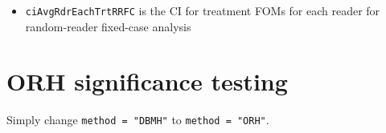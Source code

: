\documentclass[]{book}
\newenvironment{Shaded}{\begin{snugshade}}{\end{snugshade}}
\newcommand{\CommentTok}[1]{\textcolor[rgb]{0.56,0.35,0.01}{\textit{#1}}}
\newcommand{\NormalTok}[1]{#1}
\newcommand{\OperatorTok}[1]{\textcolor[rgb]{0.81,0.36,0.00}{\textbf{#1}}}
\providecommand{\tightlist}{%
  \setlength{\itemsep}{0pt}\setlength{\parskip}{0pt}}
\begin{document}
\begin{itemize}
\tightlist
\item
  \texttt{ciAvgRdrEachTrtRRFC} is the CI for treatment FOMs for each reader for random-reader fixed-case analysis
\end{itemize}

\begin{Shaded}
\end{Shaded}

\hypertarget{orh-significance-testing}{%
\section{ORH significance testing}\label{orh-significance-testing}}

Simply change \texttt{method\ =\ "DBMH"} to \texttt{method\ =\ "ORH"}.
\end{document}
